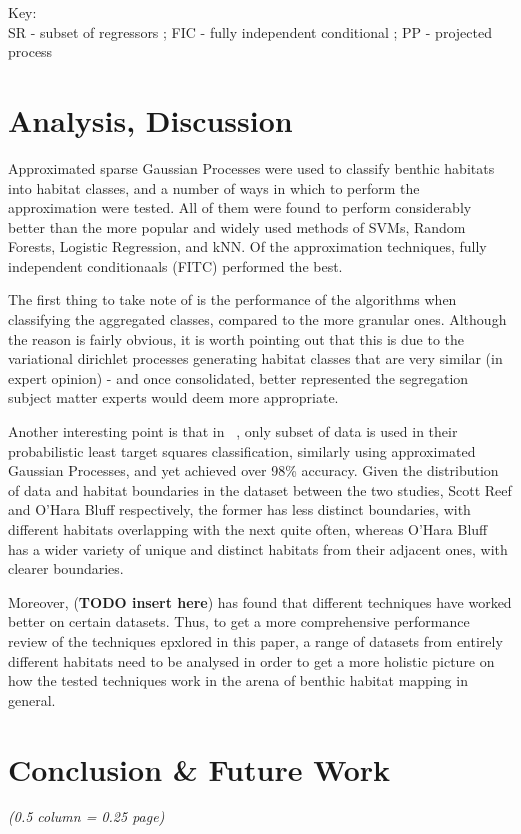 \documentclass[10pt,sts]{article}
\begin{document}
\begin{multicols}{2}
Key:\\
SR - subset of regressors ; FIC - fully independent conditional ; PP - projected process

\section{Analysis, Discussion}
Approximated sparse Gaussian Processes were used to classify benthic habitats into habitat classes, and a number of ways in which to perform the approximation were tested. All of them were found to perform considerably better than the more popular and widely used methods of SVMs, Random Forests, Logistic Regression, and kNN. Of the approximation techniques, fully independent conditionaals (FITC) performed the best.

The first thing to take note of is the performance of the algorithms when classifying the aggregated classes, compared to the more granular ones. Although the reason is fairly obvious, it is worth pointing out that this is due to the variational dirichlet processes generating habitat classes that are very similar (in expert opinion) - and once consolidated, better represented the segregation subject matter experts would deem more appropriate.

Another interesting point is that in ~\citet{bender12}, only subset of data is used in their probabilistic least target squares classification, similarly using approximated Gaussian Processes, and yet achieved over 98\% accuracy. Given the distribution of data and habitat boundaries in the dataset between the two studies, Scott Reef and O'Hara Bluff respectively, the former has less distinct boundaries, with different habitats overlapping with the next quite often, whereas O'Hara Bluff has a wider variety of unique and distinct habitats from their adjacent ones, with clearer boundaries.

Moreover, (\textbf{TODO insert here}) has found that different techniques have worked better on certain datasets. Thus, to get a more comprehensive performance review of the techniques epxlored in this paper, a range of datasets from entirely different habitats need to be analysed in order to get a more holistic picture on how the tested techniques work in the arena of benthic habitat mapping in general.

\vfill
\columnbreak

\section{Conclusion \& Future Work}
\textit{(0.5 column = 0.25 page)}


\end{multicols}
\end{document}
